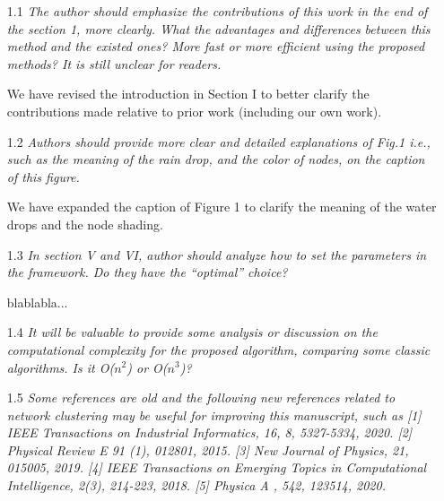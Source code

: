 \documentclass[11pt,onecolumn]{IEEEtran}
\begin{document}
\begin{enumerate}


\item[1.1] {\em The author should emphasize the contributions of this work in the end of the section 1, more
clearly. What the advantages and differences between this method and the existed ones? More
fast or more efficient using the proposed methods? It is still unclear for readers.
}


\vspace*{2mm}
We have revised the introduction in Section I to better clarify the contributions made 
relative to prior work (including our own work). 
\vspace*{4mm}

\item [1.2] {\em Authors should provide more clear and detailed explanations of Fig.1 i.e., such as the
meaning of the rain drop, and the color of nodes, on the caption of this figure.
}

\vspace*{2mm}
We have expanded the caption of Figure 1 to clarify the meaning of the water drops and 
the node shading. 
\vspace*{4mm}

\item [1.3] {\em In section V and VI, author should analyze how to set the parameters in the framework. Do
they have the “optimal” choice?}


\vspace*{2mm}
blablabla...
\vspace*{4mm}

\item [1.4] {\em  It will be valuable to provide some analysis or discussion on the computational complexity for
the proposed algorithm, comparing some classic algorithms. Is it O($n^2$) or O($n^3$)?}

\vspace*{2mm}

\vspace*{4mm}

\item [1.5] {\em   Some references are old and the following new references related to network clustering may
be useful for improving this manuscript, such as [1] IEEE Transactions on Industrial Informatics,
16, 8, 5327-5334, 2020. [2] Physical Review E 91 (1), 012801, 2015. [3] New Journal of
Physics, 21, 015005, 2019. [4] IEEE Transactions on Emerging Topics in Computational
Intelligence, 2(3), 214-223, 2018. [5] Physica A , 542, 123514, 2020.}


\end{enumerate}
\end{document}
